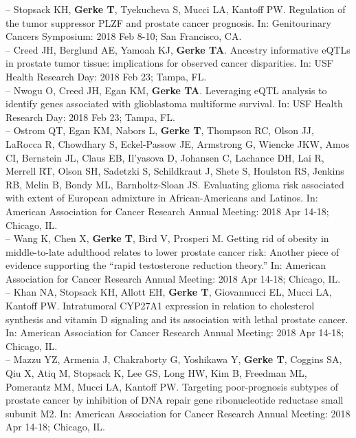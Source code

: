 \documentclass[11pt, a4paper]{article} %
\begin{document}
-- Stopsack KH, {\bf Gerke T}, Tyekucheva S, Mucci LA, Kantoff PW. Regulation of the tumor suppressor PLZF and prostate cancer prognosis. In: Genitourinary Cancers Symposium: 2018 Feb 8-10; San Francisco, CA.\\

-- Creed JH, Berglund AE, Yamoah KJ, {\bf Gerke TA}. Ancestry informative eQTLs in prostate tumor tissue: implications for observed cancer disparities. In: USF Health Research Day: 2018 Feb 23; Tampa, FL. \\

-- Nwogu O, Creed JH, Egan KM, {\bf Gerke TA}. Leveraging eQTL analysis to identify genes associated with glioblastoma multiforme survival. In: USF Health Research Day: 2018 Feb 23; Tampa, FL. \\

-- Ostrom QT, Egan KM, Nabors L, {\bf Gerke T}, Thompson RC, Olson JJ, LaRocca R, Chowdhary S, Eckel-Passow JE, Armstrong G, Wiencke JKW, Amos CI, Bernstein JL, Claus EB, Il'yasova D, Johansen C, Lachance DH, Lai R, Merrell RT, Olson SH, Sadetzki S, Schildkraut J, Shete S, Houlston RS, Jenkins RB, Melin B, Bondy ML, Barnholtz-Sloan JS. Evaluating glioma risk associated with extent of European admixture in African-Americans and Latinos. In: American Association for Cancer Research Annual Meeting: 2018 Apr 14-18; Chicago, IL.\\

-- Wang K, Chen X, {\bf Gerke T}, Bird V, Prosperi M.  Getting rid of obesity in middle-to-late adulthood relates to lower prostate cancer risk: Another piece of evidence supporting the ``rapid testosterone reduction theory.'' In: American Association for Cancer Research Annual Meeting: 2018 Apr 14-18; Chicago, IL.\\

-- Khan NA, Stopsack KH, Allott EH, {\bf Gerke T}, Giovannucci EL, Mucci LA, Kantoff PW. Intratumoral CYP27A1 expression in relation to cholesterol synthesis and vitamin D signaling and its association with lethal prostate cancer. In: American Association for Cancer Research Annual Meeting: 2018 Apr 14-18; Chicago, IL.\\

-- Mazzu YZ, Armenia J, Chakraborty G, Yoshikawa Y, {\bf Gerke T}, Coggins SA, Qiu X, Atiq M, Stopsack K, Lee GS, Long HW, Kim B, Freedman ML, Pomerantz MM, Mucci LA, Kantoff PW. Targeting poor-prognosis subtypes of prostate cancer by inhibition of DNA repair gene ribonucleotide reductase small subunit M2. In: American Association for Cancer Research Annual Meeting: 2018 Apr 14-18; Chicago, IL.\\
\end{document}
